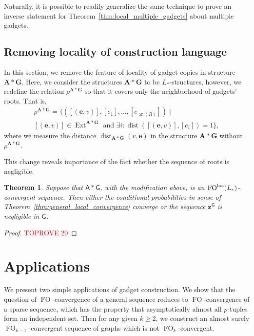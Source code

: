 \documentclass[11pt]{article}
\theoremstyle{plain}
\newtheorem{theorem}{Theorem}[section]
\theoremstyle{definition}
\theoremstyle{remark}
\DeclareMathOperator\dist{dist}
\DeclareMathOperator\aritysym{ar}
\newcommand{\arity}[1]{{\aritysym({#1})}}
\DeclareMathOperator\FO{FO}
\newcommand{\FOloc}[1]{\FO_{#1}^\textnormal{loc}}
\newcommand{\str}[1]{\mathbf{#1}}
\newcommand{\strseq}[1]{{\boldsymbol{\mathsf{#1}}}}
\newcommand{\tpl}[1]{{\bm{#1}}}
\DeclareMathOperator\Ext{Ext}
\begin{document}
Naturally, it is possible to readily generalize the same technique to prove an inverse statement for Theorem~\ref{thm:local_multiple_gadgets} about multiple gadgets.

\subsection{Removing locality of construction language}\label{ssec:omitting_locality_of_construction_language}

In this section, we remove the feature of locality of gadget copies in structure $\str{A}*\str{G}$.
Here, we consider the structures $\str{A}*\str{G}$ to be $L_*$-structures, however, we redefine the relation $\rho^{\str{A}*\str{G}}$ so that it covers only the neighborhood of gadgets' roots.
That is,
\begin{multline*}
    \rho^{\str{A}*\str{G}} = \big\{([(\tpl{e}, v)], [e_1], \dots, [e_\arity{R}]) \;\big|\;
    \\
    [(\tpl{e}, v)] \in \Ext^{\str{A}*\str{G}} \text{ and } \exists i : \dist([(\tpl{e}, v)], [e_i]) = 1\big\}
    ,
\end{multline*}
where we measure the distance $\dist_{\str{A}*\str{G}}(v, \tpl{e})$ in the structure $\str{A}*\str{G}$ without $\rho^{\str{A}*\str{G}}$.

This change reveals importance of the fact whether the sequence of roots is negligible.

\begin{theorem}\label{thm:inverse_for_construction_language_without_locality}
    Suppose that $\strseq{A}*\strseq{G}$, with the modification above, is an $\FOloc{}(L_*)$-convergent sequence.
    Then either the conditional probabilities in sense of Theorem~\ref{thm:general_local_convergence} converge or the sequence $\tpl{z}^\strseq{G}$ is negligible in $\strseq{G}$.
\end{theorem}
\begin{proof}\textcolor{red}{TOPROVE 20}\end{proof} \section{Applications}\label{sec:applications}

We present two simple applications of gadget construction.
We show that the question of $\FO$-convergence of a general sequence reduces to $\FO$-convergence of a sparse sequence, which has the property that asymptotically almost all $p$-tuples form an independent set.
Then for any given $k \geq 2$, we construct an almost surely $\FO_{k-1}$-convergent sequence of graphs which is not $\FO_k$-convergent.
\end{document}
